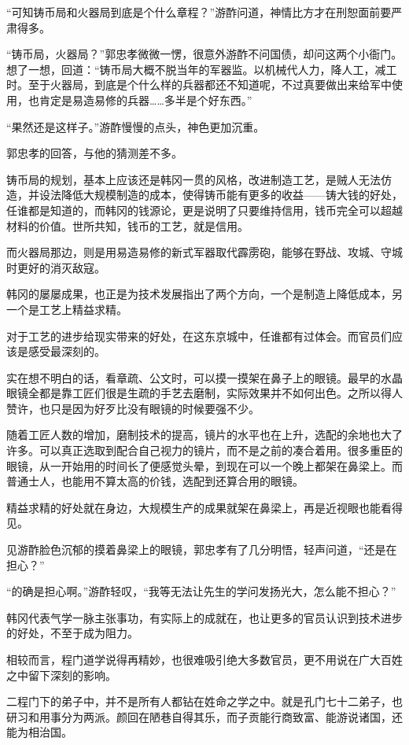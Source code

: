 “可知铸币局和火器局到底是个什么章程？”游酢问道，神情比方才在刑恕面前要严肃得多。

“铸币局，火器局？”郭忠孝微微一愣，很意外游酢不问国债，却问这两个小衙门。想了一想，回道：“铸币局大概不脱当年的军器监。以机械代人力，降人工，减工时。至于火器局，到底是个什么样的兵器都还不知道呢，不过真要做出来给军中使用，也肯定是易造易修的兵器……多半是个好东西。”

“果然还是这样子。”游酢慢慢的点头，神色更加沉重。

郭忠孝的回答，与他的猜测差不多。

铸币局的规划，基本上应该还是韩冈一贯的风格，改进制造工艺，是贼人无法仿造，并设法降低大规模制造的成本，使得铸币能有更多的收益——铸大钱的好处，任谁都是知道的，而韩冈的钱源论，更是说明了只要维持信用，钱币完全可以超越材料的价值。世所共知，钱币的工艺，就是信用。

而火器局那边，则是用易造易修的新式军器取代霹雳砲，能够在野战、攻城、守城时更好的消灭敌寇。

韩冈的屡屡成果，也正是为技术发展指出了两个方向，一个是制造上降低成本，另一个是工艺上精益求精。

对于工艺的进步给现实带来的好处，在这东京城中，任谁都有过体会。而官员们应该是感受最深刻的。

实在想不明白的话，看章疏、公文时，可以摸一摸架在鼻子上的眼镜。最早的水晶眼镜全都是靠工匠们很是生疏的手艺去磨制，实际效果并不如何出色。之所以得人赞许，也只是因为好歹比没有眼镜的时候要强不少。

随着工匠人数的增加，磨制技术的提高，镜片的水平也在上升，选配的余地也大了许多。可以真正选取到配合自己视力的镜片，而不是之前的凑合着用。很多重臣的眼镜，从一开始用的时间长了便感觉头晕，到现在可以一个晚上都架在鼻梁上。而普通士人，也能用不算太高的价钱，选配到还算合用的眼镜。

精益求精的好处就在身边，大规模生产的成果就架在鼻梁上，再是近视眼也能看得见。

见游酢脸色沉郁的摸着鼻梁上的眼镜，郭忠孝有了几分明悟，轻声问道，“还是在担心？”

“的确是担心啊。”游酢轻叹，“我等无法让先生的学问发扬光大，怎么能不担心？”

韩冈代表气学一脉主张事功，有实际上的成就在，也让更多的官员认识到技术进步的好处，不至于成为阻力。

相较而言，程门道学说得再精妙，也很难吸引绝大多数官员，更不用说在广大百姓之中留下深刻的影响。

二程门下的弟子中，并不是所有人都钻在姓命之学之中。就是孔门七十二弟子，也研习和用事分为两派。颜回在陋巷自得其乐，而子贡能行商致富、能游说诸国，还能为相治国。

